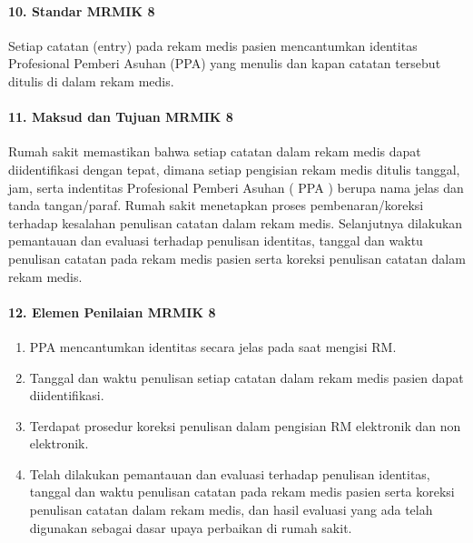 \documentclass[
]{book}
\providecommand{\tightlist}{%
  \setlength{\itemsep}{0pt}\setlength{\parskip}{0pt}}
\begin{document}
\hypertarget{standar-mrmik-8}{%
\paragraph*{10. Standar MRMIK 8}\label{standar-mrmik-8}}

Setiap catatan (entry) pada rekam medis pasien mencantumkan identitas Profesional Pemberi Asuhan (PPA) yang menulis dan kapan catatan tersebut ditulis di dalam rekam medis.

\hypertarget{maksud-dan-tujuan-mrmik-8}{%
\paragraph*{11. Maksud dan Tujuan MRMIK 8}\label{maksud-dan-tujuan-mrmik-8}}

Rumah sakit memastikan bahwa setiap catatan dalam rekam medis dapat diidentifikasi dengan tepat, dimana setiap pengisian rekam medis ditulis tanggal, jam, serta indentitas Profesional Pemberi Asuhan ( PPA ) berupa nama jelas dan tanda tangan/paraf. Rumah sakit menetapkan proses pembenaran/koreksi terhadap kesalahan penulisan catatan dalam rekam medis. Selanjutnya dilakukan pemantauan dan evaluasi terhadap penulisan identitas, tanggal dan waktu penulisan catatan pada rekam medis pasien serta koreksi penulisan catatan dalam rekam medis.

\hypertarget{elemen-penilaian-mrmik-8}{%
\paragraph*{12. Elemen Penilaian MRMIK 8}\label{elemen-penilaian-mrmik-8}}

\begin{enumerate}
\def\labelenumi{\alph{enumi}.}
\tightlist
\item
  PPA mencantumkan identitas secara jelas pada saat mengisi RM.
\item
  Tanggal dan waktu penulisan setiap catatan dalam rekam medis pasien dapat diidentifikasi.
\item
  Terdapat prosedur koreksi penulisan dalam pengisian RM elektronik dan non elektronik.
\item
  Telah dilakukan pemantauan dan evaluasi terhadap penulisan identitas, tanggal dan waktu penulisan catatan pada rekam medis pasien serta koreksi penulisan catatan dalam rekam medis, dan hasil evaluasi yang ada telah digunakan sebagai dasar upaya perbaikan di rumah sakit.
\end{enumerate}
\end{document}
